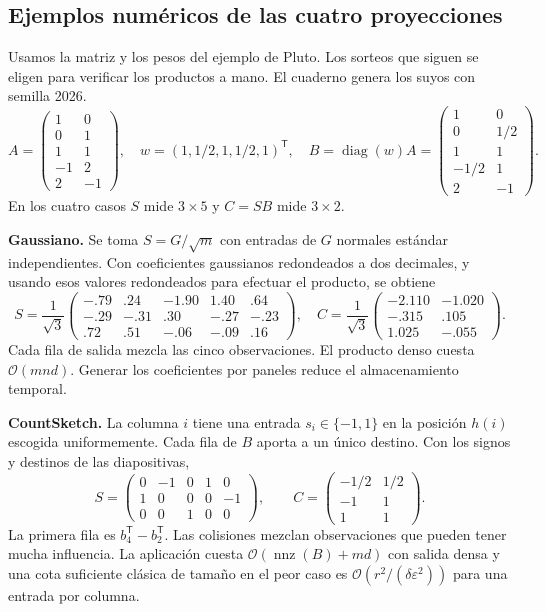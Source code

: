 \documentclass[11pt,a4paper]{article}
\newcommand{\T}{^{\mathsf T}}
\newcommand{\eps}{\varepsilon}
\newcommand{\cO}{\mathcal O}
\DeclareMathOperator{\diag}{diag}
\DeclareMathOperator{\nnz}{nnz}
\newcommand{\tema}[1]{\smallskip\par\textbf{#1}\enspace\ignorespaces}
\begin{document}
\subsection{Ejemplos numéricos de las cuatro proyecciones}\label{sec:ejemplos}
Usamos la matriz y los pesos del ejemplo de Pluto. Los sorteos que siguen se eligen para verificar los productos a mano. El cuaderno genera los suyos con semilla 2026.
\[
 A=\begin{pmatrix}1&0\\0&1\\1&1\\-1&2\\2&-1\end{pmatrix},\quad
 w=(1,1/2,1,1/2,1)\T,\quad
 B=\diag(w)A=\begin{pmatrix}1&0\\0&1/2\\1&1\\-1/2&1\\2&-1\end{pmatrix}.
\]
En los cuatro casos $S$ mide $3\times5$ y $C=SB$ mide $3\times2$.

\tema{Gaussiano.} Se toma $S=G/\sqrt m$ con entradas de $G$ normales estándar independientes. Con coeficientes gaussianos redondeados a dos decimales, y usando esos valores redondeados para efectuar el producto, se obtiene
\[
 S=\frac1{\sqrt3}\begin{pmatrix}-.79&.24&-1.90&1.40&.64\\-.29&-.31&.30&-.27&-.23\\.72&.51&-.06&-.09&.16\end{pmatrix},\quad
 C=\frac1{\sqrt3}\begin{pmatrix}-2.110&-1.020\\-.315&.105\\1.025&-.055\end{pmatrix}.
\]
Cada fila de salida mezcla las cinco observaciones. El producto denso cuesta $\cO(mnd)$. Generar los coeficientes por paneles reduce el almacenamiento temporal.

\tema{CountSketch.} La columna $i$ tiene una entrada $s_i\in\{-1,1\}$ en la posición $h(i)$ escogida uniformemente. Cada fila de $B$ aporta a un único destino. Con los signos y destinos de las diapositivas,
\[
 S=\begin{pmatrix}0&-1&0&1&0\\1&0&0&0&-1\\0&0&1&0&0\end{pmatrix},\qquad
 C=\begin{pmatrix}-1/2&1/2\\-1&1\\1&1\end{pmatrix}.
\]
La primera fila es $b_4\T-b_2\T$. Las colisiones mezclan observaciones que pueden tener mucha influencia. La aplicación cuesta $\cO(\nnz(B)+md)$ con salida densa y una cota suficiente clásica de tamaño en el peor caso es $\cO(r^2/(\delta\eps^2))$ para una entrada por columna.
\end{document}
